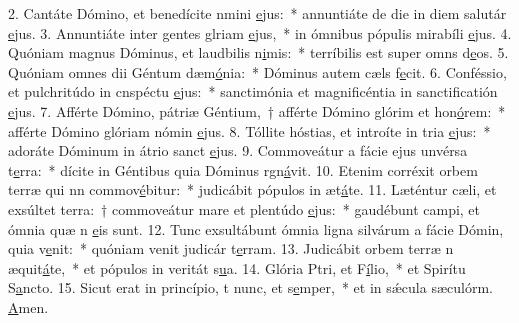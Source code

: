 2. Cantáte Dómino, et benedícite nmini \uline{e}jus:~* annuntiáte de die in diem salutár \uline{e}jus.
3. Annuntiáte inter gentes glriam \uline{e}jus,~* in ómnibus pópulis mirabíli \uline{e}jus.
4. Quóniam magnus Dóminus, et laudbilis n\uline{i}mis:~* terríbilis est super omns d\uline{e}os.
5. Quóniam omnes dii Géntum dæm\uline{ó}nia:~* Dóminus autem cæls f\uline{e}cit.
6. Conféssio, et pulchritúdo in cnspéctu \uline{e}jus:~* sanctimónia et magnificéntia in sanctificatión \uline{e}jus.
7. Afférte Dómino, pátriæ Géntium,~† afférte Dómino glórim et hon\uline{ó}rem:~* afférte Dómino glóriam nómin \uline{e}jus.
8. Tóllite hóstias, et introíte in tria \uline{e}jus:~* adoráte Dóminum in átrio sanct \uline{e}jus.
9. Commoveátur a fácie ejus unvérsa t\uline{e}rra:~* dícite in Géntibus quia Dóminus rgn\uline{á}vit.
10. Etenim corréxit orbem terræ qui nn commov\uline{é}bitur:~* judicábit pópulos in æt\uline{á}te.
11. Læténtur cæli, et exsúltet terra:~† commoveátur mare et plentúdo \uline{e}jus:~* gaudébunt campi, et ómnia quæ n \uline{e}is sunt.
12. Tunc exsultábunt ómnia ligna silvárum a fácie Dómin, quia v\uline{e}nit:~* quóniam venit judicár t\uline{e}rram.
13. Judicábit orbem terræ n æquit\uline{á}te,~* et pópulos in veritát s\uline{u}a.
14. Glória Ptri, et F\uline{í}lio,~* et Spirítu S\uline{a}ncto.
15. Sicut erat in princípio, t nunc, et s\uline{e}mper,~* et in sǽcula sæculórm. \uline{A}men.
